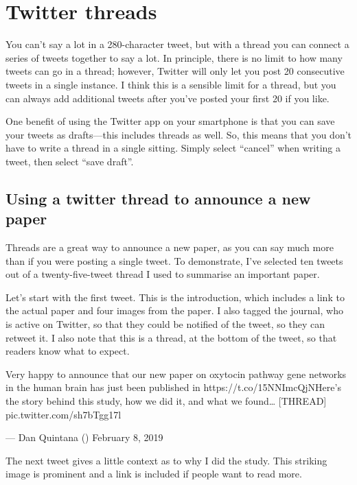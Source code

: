 \documentclass[]{book}
\begin{document}
\hypertarget{twitter-threads}{%
\section{Twitter threads}\label{twitter-threads}}

You can't say a lot in a 280-character tweet, but with a thread you can connect a series of tweets together to say a lot. In principle, there is no limit to how many tweets can go in a thread; however, Twitter will only let you post 20 consecutive tweets in a single instance. I think this is a sensible limit for a thread, but you can always add additional tweets after you've posted your first 20 if you like.

One benefit of using the Twitter app on your smartphone is that you can save your tweets as drafts---this includes threads as well. So, this means that you don't have to write a thread in a single sitting. Simply select ``cancel'' when writing a tweet, then select ``save draft''.

\hypertarget{using-a-twitter-thread-to-announce-a-new-paper}{%
\subsection{Using a twitter thread to announce a new paper}\label{using-a-twitter-thread-to-announce-a-new-paper}}

Threads are a great way to announce a new paper, as you can say much more than if you were posting a single tweet. To demonstrate, I've selected ten tweets out of a twenty-five-tweet thread I used to summarise an important paper.

Let's start with the first tweet. This is the introduction, which includes a link to the actual paper and four images from the paper. I also tagged the journal, who is active on Twitter, so that they could be notified of the tweet, so they can retweet it. I also note that this is a thread, at the bottom of the tweet, so that readers know what to expect.

Very happy to announce that our new paper on oxytocin pathway gene networks in the human brain has just been published in \citet{NatureComms} https://t.co/15NNImcQjNHere's the story behind this study, how we did it, and what we found\ldots{} {[}THREAD{]} pic.twitter.com/sh7bTgg17l

--- Dan Quintana (\citet{dsquintana}) February 8, 2019

The next tweet gives a little context as to why I did the study. This striking image is prominent and a link is included if people want to read more.
\end{document}
